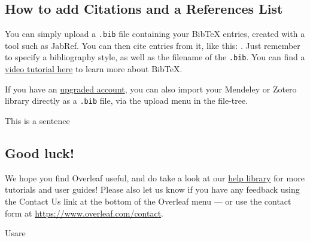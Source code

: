 \documentclass{article}
\begin{document}
\subsection{How to add Citations and a References List}

You can simply upload a \verb|.bib| file containing your BibTeX entries, created with a tool such as JabRef. You can then cite entries from it, like this: \cite{greenwade93}. Just remember to specify a bibliography style, as well as the filename of the \verb|.bib|. You can find a \href{https://www.overleaf.com/help/97-how-to-include-a-bibliography-using-bibtex}{video tutorial here} to learn more about BibTeX.

If you have an \href{https://www.overleaf.com/user/subscription/plans}{upgraded account}, you can also import your Mendeley or Zotero library directly as a \verb|.bib| file, via the upload menu in the file-tree.


This is a sentence


\subsection{Good luck!}

We hope you find Overleaf useful, and do take a look at our \href{https://www.overleaf.com/learn}{help library} for more tutorials and user guides! Please also let us know if you have any feedback using the Contact Us link at the bottom of the Overleaf menu --- or use the contact form at \url{https://www.overleaf.com/contact}.

Usare \cite{tommasiAdvancementsCO2Methanation2024}


\end{document}
